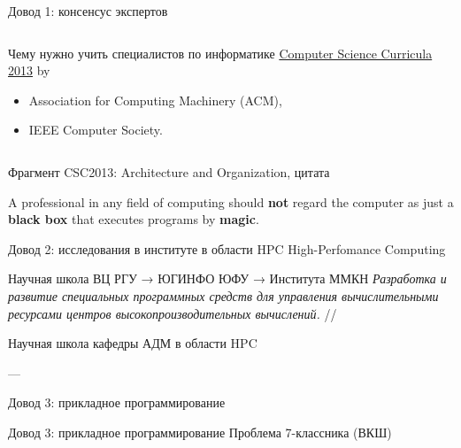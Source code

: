 \begin{frame}{Довод 1: консенсус экспертов}
\begin{columns}
    \column{0cm}
    \column{10cm}
\begin{block}{Чему нужно учить специалистов по информатике}
    \textcolor{blue}{\href{https://www.acm.org/education/CS2013-final-report.pdf}{Computer Science Curricula 2013}}
    \small by
    \begin{itemize}
        \item Association for Computing Machinery (ACM),
        \item IEEE Computer Society.
    \end{itemize}
\end{block}
\end{columns}

\pause
\begin{block}{Фрагмент CSC2013: Architecture and Organization, цитата}
\begin{quoting}
A professional in any field of computing should \textbf{not} regard the computer as just a \textbf{black
box} that executes programs by \textbf{magic}.
\end{quoting}
\end{block}
\end{frame}

\begin{frame}{Довод 2: исследования в институте в области HPC}
High-Perfomance Computing

\begin{block}{Научная школа ВЦ РГУ → ЮГИНФО ЮФУ → Института ММКН}
\textit{Разработка и развитие специальных программных средств для управления вычислительными ресурсами центров высокопроизводительных вычислений.} // 
\end{block}
\end{frame}

\begin{frame}{Научная школа кафедры АДМ в области HPC}

— 
\end{frame}

\begin{frame}{Довод 3: прикладное программирование}
\end{frame}

\begin{frame}{Довод 3: прикладное программирование}
Проблема 7-классника (ВКШ)
\end{frame}


